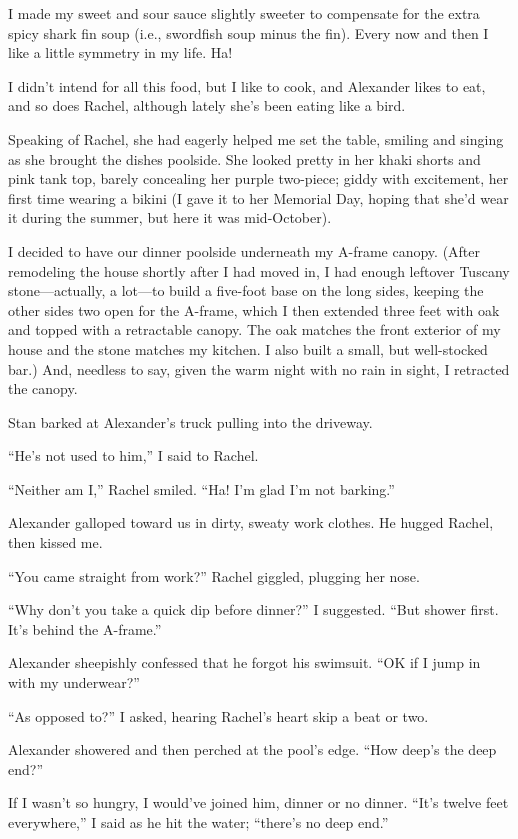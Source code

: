 I made my sweet and sour sauce slightly sweeter to compensate for the
extra spicy shark fin soup (i.e., swordfish soup minus the fin). Every
now and then I like a little symmetry in my life. Ha!

I didn't intend for all this food, but I like to cook, and Alexander
likes to eat, and so does Rachel, although lately she's been eating like
a bird.

Speaking of Rachel, she had eagerly helped me set the table, smiling and
singing as she brought the dishes poolside. She looked pretty in her
khaki shorts and pink tank top, barely concealing her purple two-piece;
giddy with excitement, her first time wearing a bikini (I gave it to her
Memorial Day, hoping that she'd wear it during the summer, but here it
was mid-October).

I decided to have our dinner poolside underneath my A-frame canopy.
(After remodeling the house shortly after I had moved in, I had enough
leftover Tuscany stone---actually, a lot---to build a five-foot base on
the long sides, keeping the other sides two open for the A-frame, which
I then extended three feet with oak and topped with a retractable
canopy. The oak matches the front exterior of my house and the stone
matches my kitchen. I also built a small, but well-stocked bar.) And,
needless to say, given the warm night with no rain in sight, I retracted
the canopy.

Stan barked at Alexander's truck pulling into the driveway.

``He's not used to him,'' I said to Rachel.

``Neither am I,'' Rachel smiled. ``Ha! I'm glad I'm not barking.''

Alexander galloped toward us in dirty, sweaty work clothes. He hugged
Rachel, then kissed me.

``You came straight from work?'' Rachel giggled, plugging her nose.

``Why don't you take a quick dip before dinner?'' I suggested. ``But
shower first. It's behind the A-frame.''

Alexander sheepishly confessed that he forgot his swimsuit. ``OK if I
jump in with my underwear?''

``As opposed to?'' I asked, hearing Rachel's heart skip a beat or two.

Alexander showered and then perched at the pool's edge. ``How deep's the
deep end?''

If I wasn't so hungry, I would've joined him, dinner or no dinner.
``It's twelve feet everywhere,'' I said as he hit the water; ``there's
no deep end.''

